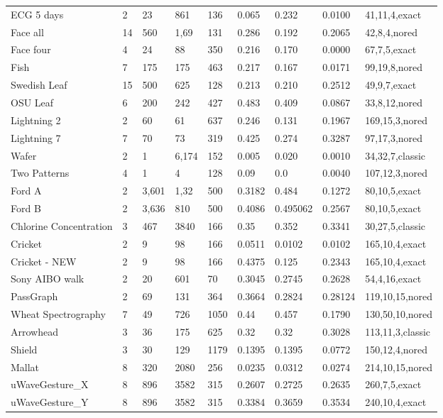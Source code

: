 \begin{table}[t!]
{{\begin{tabularx}{\linewidth}{@{} l *7X @{} l}
ECG 5 days & 2 & 23 & 861 & 136 & 0.065 & 0.232 & 0.0100 & 41,11,4,exact \\
Face all & 14 & 560 & 1,69 & 131 & 0.286 & 0.192 & 0.2065 & 42,8,4,nored \\
Face four & 4 & 24 & 88 & 350 & 0.216 & 0.170 & 0.0000 & 67,7,5,exact \\
Fish & 7 & 175 & 175 & 463 & 0.217 & 0.167 & 0.0171 & 99,19,8,nored \\
Swedish Leaf & 15 & 500 & 625 & 128 & 0.213 & 0.210 & 0.2512 & 49,9,7,exact \\
OSU Leaf & 6 & 200 & 242 & 427 & 0.483 & 0.409 & 0.0867 & 33,8,12,nored \\
Lightning 2 & 2 & 60 & 61 & 637 & 0.246 & 0.131 & 0.1967 & 169,15,3,nored \\
Lightning 7 & 7 & 70 & 73 & 319 & 0.425 & 0.274 & 0.3287 & 97,17,3,nored \\
Wafer & 2 & 1 & 6,174 & 152 & 0.005 & 0.020 & 0.0010 & 34,32,7,classic \\
Two Patterns & 4 & 1 & 4 & 128 & 0.09 & 0.0 & 0.0040 & 107,12,3,nored \\
Ford A & 2 & 3,601 & 1,32 & 500 & 0.3182 & 0.484 & 0.1272 & 80,10,5,exact \\
Ford B & 2 & 3,636 & 810 & 500 & 0.4086 & 0.495062 & 0.2567 & 80,10,5,exact \\
Chlorine Concentration & 3 & 467 & 3840 & 166 & 0.35 & 0.352 & 0.3341 & 30,27,5,classic \\
Cricket & 2 & 9 & 98 & 166 & 0.0511 & 0.0102 & 0.0102 & 165,10,4,exact \\
Cricket - NEW & 2 & 9 & 98 & 166 & 0.4375 & 0.125 & 0.2343 & 165,10,4,exact \\
Sony AIBO walk & 2 & 20 & 601 & 70 & 0.3045 & 0.2745 & 0.2628 & 54,4,16,exact \\
PassGraph & 2 & 69 & 131 & 364 & 0.3664 & 0.2824 & 0.28124 & 119,10,15,nored \\
Wheat Spectrography & 7 & 49 & 726 & 1050 & 0.44 & 0.457 & 0.1790 & 130,50,10,nored \\
Arrowhead & 3 & 36 & 175 & 625 & 0.32 & 0.32 & 0.3028 & 113,11,3,classic \\
Shield & 3 & 30 & 129 & 1179 & 0.1395 & 0.1395 & 0.0772 & 150,12,4,nored \\
Mallat & 8 & 320 & 2080 & 256 & 0.0235 & 0.0312 & 0.0274 & 214,10,15,nored \\ 
uWaveGesture\_X & 8 & 896 & 3582 & 315 & 0.2607 & 0.2725 & 0.2635 & 260,7,5,exact \\
uWaveGesture\_Y & 8 & 896 & 3582 & 315 & 0.3384 & 0.3659 & 0.3534 & 240,10,4,exact \\

\end{tabularx}}}
\end{table}
